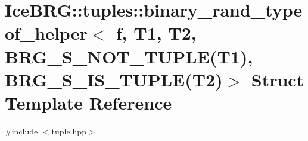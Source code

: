 \hypertarget{structIceBRG_1_1tuples_1_1binary__rand__typeof__helper_3_01f_00_01T1_00_01T2_00_01BRG__S__NOT__Taf66ad01f9236805ac3540fbfcbdbe8d}{}\section{Ice\+B\+R\+G\+:\+:tuples\+:\+:binary\+\_\+rand\+\_\+typeof\+\_\+helper$<$ f, T1, T2, B\+R\+G\+\_\+\+S\+\_\+\+N\+O\+T\+\_\+\+T\+U\+P\+L\+E(T1), B\+R\+G\+\_\+\+S\+\_\+\+I\+S\+\_\+\+T\+U\+P\+L\+E(T2)$>$ Struct Template Reference}
\label{structIceBRG_1_1tuples_1_1binary__rand__typeof__helper_3_01f_00_01T1_00_01T2_00_01BRG__S__NOT__Taf66ad01f9236805ac3540fbfcbdbe8d}


{\ttfamily \#include $<$tuple.\+hpp$>$}

